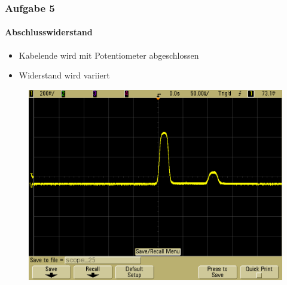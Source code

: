 \begin{frame}
    \frametitle{Aufgabe 5}
    \framesubtitle{Abschlusswiderstand}
    \begin{itemize}
        \item Kabelende wird mit Potentiometer abgeschlossen
        \item Widerstand wird variiert
    \end{itemize}
    \begin{figure}[H]
    \begin{center}
            \includegraphics[scale=0.2]{./img/5b_Potentiometer_3.png}
    \end{center}
    \end{figure}
\end{frame}
